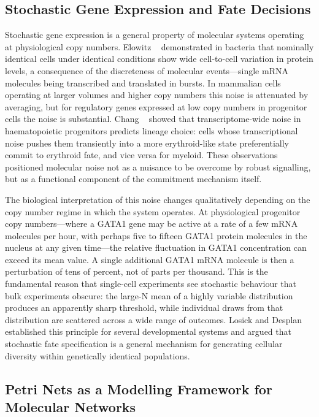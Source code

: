 \subsection{Stochastic Gene Expression and Fate Decisions}

Stochastic gene expression is a general property of molecular systems operating at physiological copy numbers. Elowitz \etal~\cite{elowitz2002} demonstrated in bacteria that nominally identical cells under identical conditions show wide cell-to-cell variation in protein levels, a consequence of the discreteness of molecular events---single mRNA molecules being transcribed and translated in bursts. In mammalian cells operating at larger volumes and higher copy numbers this noise is attenuated by averaging, but for regulatory genes expressed at low copy numbers in progenitor cells the noise is substantial. Chang \etal~\cite{chang2008} showed that transcriptome-wide noise in haematopoietic progenitors predicts lineage choice: cells whose transcriptional noise pushes them transiently into a more erythroid-like state preferentially commit to erythroid fate, and vice versa for myeloid. These observations positioned molecular noise not as a nuisance to be overcome by robust signalling, but as a functional component of the commitment mechanism itself.

The biological interpretation of this noise changes qualitatively depending on the copy number regime in which the system operates. At physiological progenitor copy numbers---where a GATA1 gene may be active at a rate of a few mRNA molecules per hour, with perhaps five to fifteen GATA1 protein molecules in the nucleus at any given time---the relative fluctuation in GATA1 concentration can exceed its mean value. A single additional GATA1 mRNA molecule is then a perturbation of tens of percent, not of parts per thousand. This is the fundamental reason that single-cell experiments see stochastic behaviour that bulk experiments obscure: the large-N mean of a highly variable distribution produces an apparently sharp threshold, while individual draws from that distribution are scattered across a wide range of outcomes. Losick and Desplan~\cite{losick2008} established this principle for several developmental systems and argued that stochastic fate specification is a general mechanism for generating cellular diversity within genetically identical populations.

\subsection{Petri Nets as a Modelling Framework for Molecular Networks}

